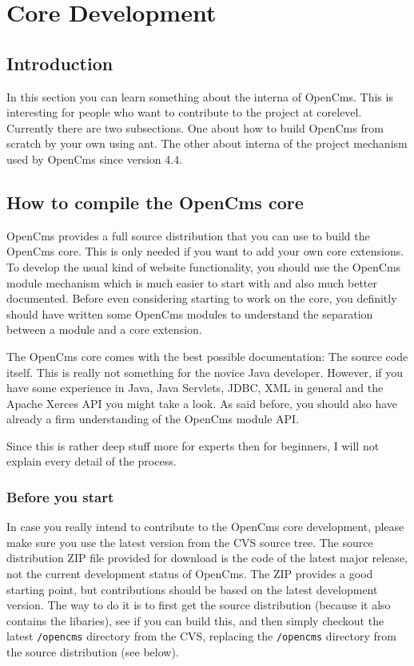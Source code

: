 \chapter{Core Development}

\section{Introduction}

In this section you can learn something about the interna of OpenCms. This
is interesting for people who want to contribute to the project at 
core\-level. Currently there are two subsections. One about how to build
OpenCms from scratch by your own using ant. The other about interna of the
project mechanism used by OpenCms since version 4.4.

\section{How to compile the OpenCms core}
OpenCms provides a full source distribution that you can use to build the
OpenCms core. This is only needed if you want to add your own core 
extensions. To develop the usual kind of website functionality, you 
should use the OpenCms module mechanism which is much easier to start with 
and also much better documented. Before even considering starting to work 
on the core, you definitly should have written some OpenCms modules to 
understand the separation between a module and a core extension. 

The OpenCms core comes with the best possible documentation: The source
code itself. This is really not something for the novice Java developer.
However, if you have some experience in Java, Java Servlets, JDBC, XML in 
general and the Apache Xerces API you might take a look. As said before, 
you should also have already a firm understanding of the OpenCms module API. 

Since this is rather deep stuff more for experts then for beginners, I 
will not explain every detail of the process.

\subsection{Before you start}

In case you really intend to contribute to the OpenCms core development, 
please make sure you use the latest version from the CVS source tree. The
source distribution ZIP file provided for download is the code of the latest
major release, not the current development status of OpenCms. The ZIP provides
a good starting point, but contributions should be based on the latest 
development version. The way to do it is to first get the source distribution 
(because it also contains the libaries), see if you can build this, and then 
simply checkout the latest \texttt{/opencms} directory from the CVS, replacing the 
\texttt{/opencms} directory from the source distribution (see below).

